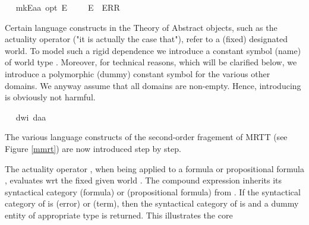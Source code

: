 \begin{isabellebody}
\ \isamarkupfalse%
\ mkE{\isacharcolon}{\isacharcolon}{\isachardoublequoteopen}{\isacharprime}a{\isasymRightarrow}{\isacharprime}a\ opt{\isachardoublequoteclose}\ {\isacharparenleft}{\isachardoublequoteopen}{\isacharunderscore}\isactrlsup E{\isachardoublequoteclose}\ {\isacharbrackleft}{}{}{}{\isacharbrackright}\ {}{}{}{\isacharparenright}\ \ \ {\isachardoublequoteopen}{\isasymphi}\isactrlsup E\ {\isasymequiv}\ ERR\ {\isasymphi}{\isachardoublequoteclose}%
\begin{isamarkuptext}%
Certain language constructs in the Theory of Abstract objects, such as the actuality operator  
  \isa{\isactrlbold {\isasymA}} ("it is actually the case that"), refer to a (fixed) designated world. To model such a 
  rigid dependence we introduce a constant symbol (name)  of world type . 
  Moreover, for technical reasons, 
  which will be clarified below, we introduce a polymorphic (dummy) constant symbol  for the various other domains. 
  We anyway assume that all domains are non-empty. Hence, introducing  is obviously not 
  harmful.%
\end{isamarkuptext}\isamarkuptrue%
\ \isamarkupfalse%
\ dw{\isacharcolon}{\isacharcolon}{\isachardoublequoteopen}i{\isachardoublequoteclose}\ da{\isacharcolon}{\isacharcolon}{\isachardoublequoteopen}{\isacharprime}a{\isachardoublequoteclose}%
\isamarkuptrue%
%
\begin{isamarkuptext}%
The various language constructs of the second-order fragement of MRTT (see Figure \ref{mmrt}) are now introduced step by step.%
\end{isamarkuptext}\isamarkuptrue%
%
\begin{isamarkuptext}%
The actuality operator \isa{\isactrlbold {\isasymA}}, when being applied to a formula or propositional formula 
  \isa{{\isasymphi}}, evaluates \isa{{\isasymphi}} wrt the fixed given world . 
  The compound expression \isa{\isactrlbold {\isasymA}{\isasymphi}} inherits its syntactical category   (formula) or
   (propositional formula) from \isa{{\isasymphi}}. If the syntactical category of  \isa{{\isasymphi}} is 
   (error) or  (term), then the syntactical category of \isa{\isactrlbold {\isasymA}{\isasymphi}} 
  is  and a dummy entity of appropriate type is returned. This illustrates the core 

\end{isamarkuptext}
\end{isabellebody}
